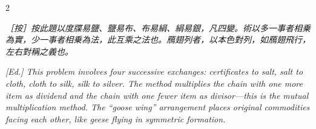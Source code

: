 \documentclass[11pt,a4paper]{article}
\newcommand{\EdNoteText}[1]{\par\noindent\textit{\color{ednotecolor}［按］#1}\par}
\newcommand{\EdNoteEn}[1]{\par\noindent\textit{\color{ednotecolor}[Ed.] #1}\par}
\begin{document}
\begin{paracol}{2}
\EdNoteText{按此題以度牒易鹽、鹽易布、布易絹、絹易銀，凡四變。術以多一事者相乗為實，少一事者相乗為法，此互乘之法也。鴈翅列者，以本色對列，如鴈翅飛行，左右對稱之義也。}
\switchcolumn
\EdNoteEn{This problem involves four successive exchanges: certificates to salt, salt to cloth, cloth to silk, silk to silver. The method multiplies the chain with one more item as dividend and the chain with one fewer item as divisor---this is the mutual multiplication method. The ``goose wing'' arrangement places original commodities facing each other, like geese flying in symmetric formation.}

\end{paracol}

\end{document}
